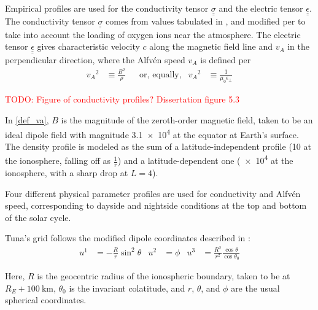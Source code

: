 \documentclass{article}
\newcommand{\todo}[1]{ \textcolor{red}{TODO: #1} }
\newcommand{\Alfven}{Alfv\'en\xspace}
\newcommand{\lysakx}{\ensuremath{u^1}\xspace}
\newcommand{\lysaky}{\ensuremath{u^2}\xspace}
\newcommand{\lysakz}{\ensuremath{u^3}\xspace}
\newcommand{\tensor}[1]{\ensuremath{\underline{\underline{#1}}}}
\newcommand{\va}{\ensuremath{v_A}\xspace}
\newcommand{\ep}{\ensuremath{\epsilon_\bot}\xspace}
\newcommand{\mz}{\ensuremath{\mu_0}\xspace}
\begin{document}

Empirical profiles are used for the conductivity tensor
$\tensor{\sigma}$ and the electric tensor $\tensor{\epsilon}$. The
conductivity tensor $\tensor{\sigma}$ comes from values tabulated in
\cite{kelley_1989}, and modified per \cite{lysak_2013} to take into
account the loading of oxygen ions near the atmosphere. The electric
tensor $\tensor{\epsilon}$ gives characteristic velocity $c$ along the
magnetic field line and $\va$ in the perpendicular direction, where the
\Alfven speed $\va$ is defined per
\begin{align}
    \label{def_va}
    \va^2 &\equiv \frac{B^2}{\rho} &
    & \text{or, equally,} &
    \va^2 &\equiv \frac{1}{\mz\ep}
\end{align}

\todo{Figure of conductivity profiles? Dissertation figure 5.3}

In \cref{def_va}, $B$ is the magnitude of the zeroth-order magnetic
field, taken to be an ideal dipole field with magnitude \SI{3.1e4}{\nT}
at the equator at Earth's surface. The density profile is modeled as the
sum of a latitude-independent profile (\SI{10}{\percc} at the
ionosphere, falling off as $\frac{1}{r}$) and a latitude-dependent one
(\SI{e4}{\percc} at the ionosphere, with a sharp drop at $L = 4$).

Four different physical parameter profiles are used for conductivity and
\Alfven speed, corresponding to dayside and nightside conditions at the
top and bottom of the solar cycle.


Tuna's grid follows the modified dipole coordinates described in
\cite{lysak_2004}:
\begin{align}
  \label{def_coords}
  \lysakx & = - \frac{R}{r} \sin^2 \theta &
  \lysaky & = \phi &
  \lysakz & = \frac{R^2}{r^2} \frac{\cos \theta}{\cos \theta_0}
\end{align}

Here, $R$ is the geocentric radius of the ionospheric boundary, taken to
be at $R_E + \SI{100}{\km}$, $\theta_0$ is the invariant colatitude, and
$r$, $\theta$, and $\phi$ are the usual spherical coordinates.
\end{document}
